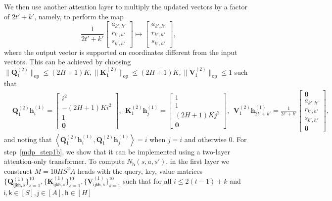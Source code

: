 \documentclass[10pt]{article}
\newcommand{\lops}[1]{\|{#1}\|_{\mathrm{op}}}
\newcommand{\<}{\left\langle}
\renewcommand{\>}{\right\rangle}
\renewcommand{\bQ}{\mathbf{Q}}
\newcommand{\bzero}{{\mathbf 0}}
\newcommand{\state}{{s}}
\newcommand{\action}{{a}}
\newcommand{\reward}{{r}}
\newcommand{\Numepi}{{K}}
\newcommand{\horizon}{{H}}
\renewcommand{\horizon}{{H}}
\newcommand{\head}{{M}}
\newcommand{\Numst}{{S}}
\newcommand{\Numact}{{A}}
\newcommand{\Numvi}{{N}}
\def\bK{{\mathbf K}}
\def\bQ{{\mathbf Q}}
\def\bV{{\mathbf V}}
\def\bh{{\mathbf h}}
\def\si{{\mathsf{i}}}
\def\sj{{\mathsf{j}}}
\def\sk{{\mathsf{k}}}
\def\sh{{\mathsf{h}}}
\begin{document}
We then use another  attention layer to  multiply the updated vectors by a factor of $2t'+k'$, namely, to perform the map
$$\frac{1}{2t'+k'}\begin{bmatrix}
        \action_{k',h'} \\\reward_{k',h'}\\\state_{k',h'}
    \end{bmatrix}\mapsto\begin{bmatrix}
        \action_{k',h'} \\\reward_{k',h'}\\\state_{k',h'}
    \end{bmatrix},$$ where the output vector is supported on coordinates different from the input vectors. This can be achieved by choosing $\lops{\bQ_1^{(2)}}\leq (2\horizon+1)\Numepi, \lops{\bK_1^{(2)}}\leq (2\horizon+1)\Numepi, \lops{\bV_1^{(2)}}\leq1$
such that \begin{align}
    &
\bQ^{(2)}_{1}\bh^{(1)}_{i}=\begin{bmatrix}
         i^2\\-(2\horizon+1)\Numepi i^2\\  1\\ \bzero
    \end{bmatrix},~~ \bK^{(2)}_{1}\bh^{(1)}_{j}=\begin{bmatrix}
        1\\1\\ (2\horizon+1)\Numepi j^2\\\bzero
    \end{bmatrix},~~
\bV^{(2)}_{1}\bh^{(1)}_{2t'+k'}=\frac{1}{2t'+k'}\begin{bmatrix}
        \bzero\\
        \action_{k',h'} \\\reward_{k',h'}\\\state_{k',h'}
    \\ \bzero
    \end{bmatrix},\label{eq:tf_constrcut_ucbvi_multi}
\end{align}
and noting that $\<\bQ^{(2)}_1\bh_i^{(1)},\bQ^{(2)}_1\bh_j^{(1)}\>=i$ when $j=i$ and otherwise $0$.
For step~\ref{mdp_step1b},  we show that it can be implemented using a two-layer attention-only transformer.
To compute $\Numvi_\sh(\state,\action,\state')$, in the first layer we construct $\head=10\horizon\Numst^2\Numact$ heads with the query, key, value matrices $\{\bQ^{(1)}_{\si\sj\sk\sh,s}\}_{s=1}^{10},\{\bK^{(1)}_{\si\sj\sk\sh,s}\}_{s=1}^{10},\{\bV^{(1)}_{\si\sj\sk\sh,s}\}_{s=1}^{10}$  such that for all $i\leq 2(t-1)+k$ and $\si,\sk\in[\Numst],\sj\in[\Numact],\sh\in[\horizon]$
\end{document}

